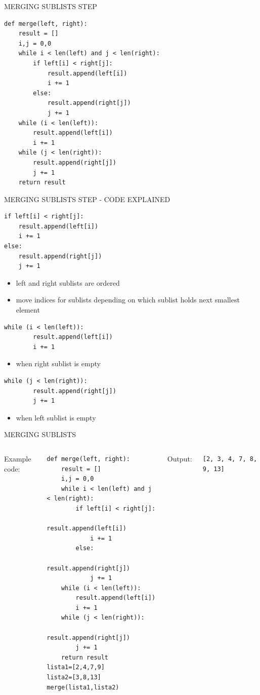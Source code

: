 \documentclass[aspectratio=169]{beamer}
\begin{document}
\begin{frame}[fragile]{MERGING SUBLISTS STEP}
\begin{lstlisting}
def merge(left, right):
	result = []
	i,j = 0,0
	while i < len(left) and j < len(right):
		if left[i] < right[j]:
			result.append(left[i])
			i += 1
		else:
			result.append(right[j])
			j += 1
	while (i < len(left)):
		result.append(left[i])
		i += 1
	while (j < len(right)):
		result.append(right[j])
		j += 1
	return result

\end{lstlisting}

\end{frame}


\begin{frame}[fragile]{MERGING SUBLISTS STEP - CODE EXPLAINED}
\begin{lstlisting}
if left[i] < right[j]:
	result.append(left[i])
	i += 1
else:
	result.append(right[j])
	j += 1
\end{lstlisting}
\begin{itemize}
\item left and right sublists are ordered
\item move indices for sublists depending on which sublist holds next smallest element
\end{itemize}
\begin{lstlisting}
while (i < len(left)):
		result.append(left[i])
		i += 1
\end{lstlisting}
\begin{itemize}
\item when right sublist is empty
\end{itemize}

\begin{lstlisting}
while (j < len(right)):
		result.append(right[j])
		j += 1
\end{lstlisting}
\begin{itemize}
\item when left sublist is empty
\end{itemize}
\end{frame}

\begin{frame}[fragile]{MERGING SUBLISTS}
\begin{columns}
Example code:
\begin{lstlisting}
def merge(left, right):
    result = []
    i,j = 0,0
    while i < len(left) and j < len(right):
        if left[i] < right[j]:
            result.append(left[i])
            i += 1
        else:
            result.append(right[j])
            j += 1
    while (i < len(left)):
        result.append(left[i])
        i += 1
    while (j < len(right)):
        result.append(right[j])
        j += 1
    return result
lista1=[2,4,7,9]
lista2=[3,8,13]
merge(lista1,lista2)
\end{lstlisting}
Output:
\begin{block}{}
\begin{verbatim}
[2, 3, 4, 7, 8, 9, 13]
\end{verbatim}
\end{block}
\end{columns}
\end{frame}
\end{document}
